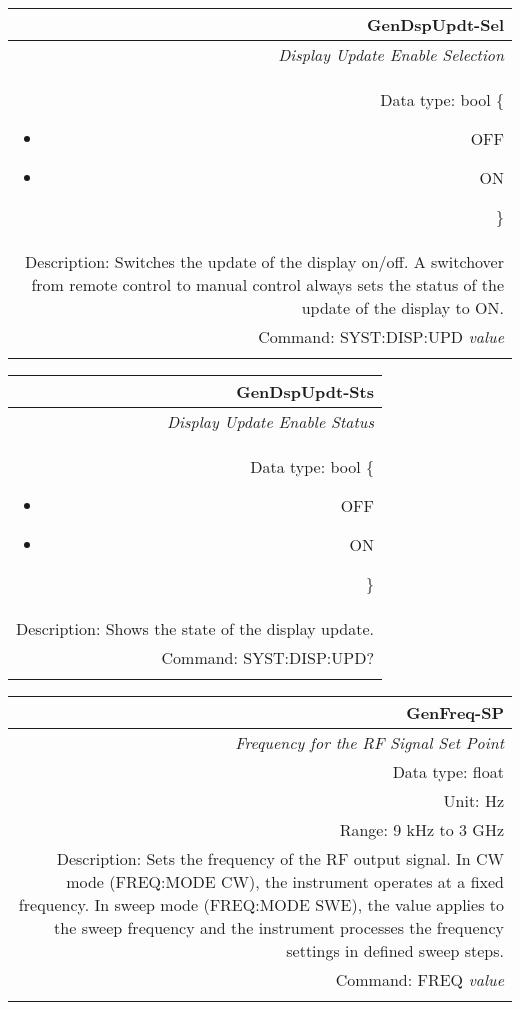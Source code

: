 \documentclass[openany]{article}
\begin{document}
		\begin{tabular}{N}
			\hline
			\bfseries GenDspUpdt-Sel \\ \hline
			\emph{Display Update Enable Selection} \\
			Data type: bool \{\begin{itemize}[noitemsep]
				\small
				\item[] OFF
				\item[] ON
			\end{itemize}\} \\
			Description: Switches the update of the display on/off. A switchover from remote control to manual control always sets the status of the update of the display to ON. \\
			Command: SYST:DISP:UPD \emph{value} \\
			\\ 

		\end{tabular}


		\begin{tabular}{N}
			\hline
			\bfseries GenDspUpdt-Sts \\ \hline
			\emph{Display Update Enable Status} \\
			Data type: bool \{\begin{itemize}[noitemsep]
				\small
				\item[] OFF
				\item[] ON
			\end{itemize}\} \\
			Description: Shows the state of the display update. \\
			Command: SYST:DISP:UPD? \\
			\\ 

		\end{tabular}


		\begin{tabular}{N}
			\hline
			\bfseries GenFreq-SP \\ \hline
			\emph{Frequency for the RF Signal Set Point} \\
			Data type: float \\
			Unit: Hz \\
			Range: 9 kHz to 3 GHz \\
			Description: Sets the frequency of the RF output signal. In CW mode (FREQ:MODE CW), the instrument operates at a fixed frequency. In sweep mode (FREQ:MODE SWE), the value applies to the sweep frequency and the instrument processes the frequency settings in defined sweep steps.\\
			Command: FREQ \emph{value} \\
			\\
			
		\end{tabular}
\end{document}

